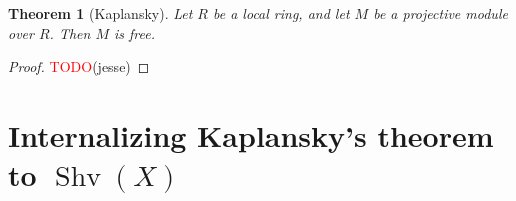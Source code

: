\documentclass[11pt]{article}
\newcommand{\remph}[1]{\textcolor{red}{#1}}
\newcommand{\TODO}{\remph{TODO}}
\newcommand{\Shv}{\operatorname{Shv}}
\theoremstyle{plain}
\newtheorem{theorem}{Theorem}[section]
\theoremstyle{definition}
\begin{document}
\begin{theorem}[Kaplansky]\label{thm:kaplansky}
  Let \(R\) be a local ring, and let \(M\) be a projective module over \(R\). Then \(M\) is free.
\end{theorem}

\begin{proof}
  \TODO(jesse)
\end{proof}

\section{Internalizing Kaplansky's theorem to \(\Shv(X)\)}


\end{document}
